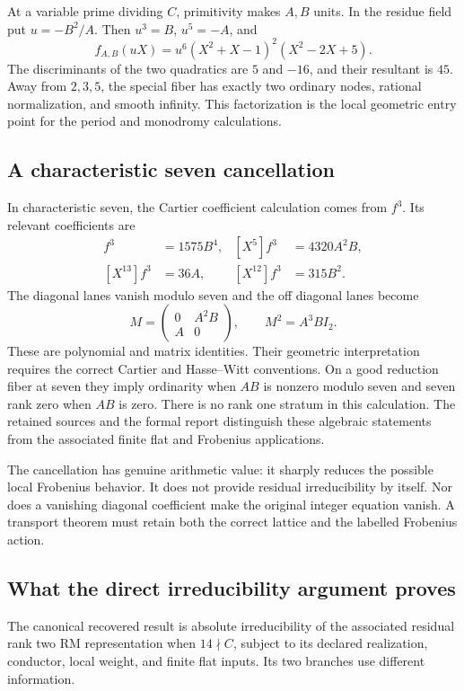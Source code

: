At a variable prime dividing $C$, primitivity makes $A,B$ units. In the residue field put $u=-B^2/A$. Then $u^3=B$, $u^5=-A$, and
\begin{equation}\label{eq:nodalfactor}
f_{A,B}(uX)=u^6(X^2+X-1)^2(X^2-2X+5).
\end{equation}
The discriminants of the two quadratics are $5$ and $-16$, and their resultant is $45$. Away from $2,3,5$, the special fiber has exactly two ordinary nodes, rational normalization, and smooth infinity. This factorization is the local geometric entry point for the period and monodromy calculations.

\subsection{A characteristic seven cancellation}
In characteristic seven, the Cartier coefficient calculation comes from $f^3$. Its relevant coefficients are
\begin{align*}
[X^6]f^3&=1575B^4,& [X^5]f^3&=4320A^2B,\\
[X^{13}]f^3&=36A,& [X^{12}]f^3&=315B^2.
\end{align*}
The diagonal lanes vanish modulo seven and the off diagonal lanes become
\begin{equation}\label{eq:cartier}
M=\begin{pmatrix}0&A^2B\\A&0\end{pmatrix},\qquad M^2=A^3B I_2.
\end{equation}
These are polynomial and matrix identities. Their geometric interpretation requires the correct Cartier and Hasse--Witt conventions. On a good reduction fiber at seven they imply ordinarity when $AB$ is nonzero modulo seven and seven rank zero when $AB$ is zero. There is no rank one stratum in this calculation. The retained sources and the formal report distinguish these algebraic statements from the associated finite flat and Frobenius applications.

The cancellation has genuine arithmetic value: it sharply reduces the possible local Frobenius behavior. It does not provide residual irreducibility by itself. Nor does a vanishing diagonal coefficient make the original integer equation vanish. A transport theorem must retain both the correct lattice and the labelled Frobenius action.

\subsection{What the direct irreducibility argument proves}
The canonical recovered result is absolute irreducibility of the associated residual rank two RM representation when $14\nmid C$, subject to its declared realization, conductor, local weight, and finite flat inputs. Its two branches use different information.

